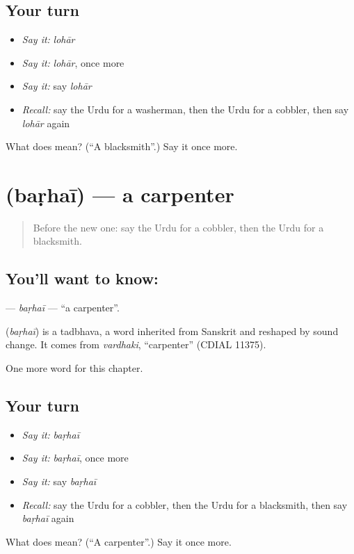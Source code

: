 \subsection*{Your turn}
\begin{itemize}
\raggedright
  \item \emph{Say it:} \emph{lohār}
  \item \emph{Say it:} \emph{lohār}, once more
  \item \emph{Say it:} say \emph{lohār}
  \item \emph{Recall:} say the Urdu for a washerman, then the Urdu for a cobbler, then say \emph{lohār} again
\end{itemize}

\begin{tcolorbox}[breakable,colback=teal!4,colframe=teal!35!black,title={Before you move on}]
What does  mean? (\textquotedblleft{}A blacksmith\textquotedblright{}.) Say it once more.
\end{tcolorbox}
\section[\texorpdfstring{\ur{بڑھئی} (baṛhaī)}{بڑھئی (baṛhaī)}]{ (baṛhaī) — a carpenter}

\label{lesson:UR-C210-barhai}



\begin{quote}
Before the new one: say the Urdu for a cobbler, then the Urdu for a blacksmith.
\end{quote}

\subsection*{You'll want to know: }
\textbf{} — \emph{baṛhaī} — \textquotedblleft{}a carpenter\textquotedblright{}.

\begin{cousinweb}
\textbf{} (\emph{baṛhaī}) is a tadbhava, a word inherited from Sanskrit and reshaped by sound change. It comes from \emph{vardhaki}, \textquotedblleft{}carpenter\textquotedblright{} (CDIAL 11375).
\end{cousinweb}

\begin{grammarlens}[title={What you've built}]
One more word for this chapter.
\end{grammarlens}

\subsection*{Your turn}
\begin{itemize}
\raggedright
  \item \emph{Say it:} \emph{baṛhaī}
  \item \emph{Say it:} \emph{baṛhaī}, once more
  \item \emph{Say it:} say \emph{baṛhaī}
  \item \emph{Recall:} say the Urdu for a cobbler, then the Urdu for a blacksmith, then say \emph{baṛhaī} again
\end{itemize}

\begin{tcolorbox}[breakable,colback=teal!4,colframe=teal!35!black,title={Before you move on}]
What does  mean? (\textquotedblleft{}A carpenter\textquotedblright{}.) Say it once more.
\end{tcolorbox}
